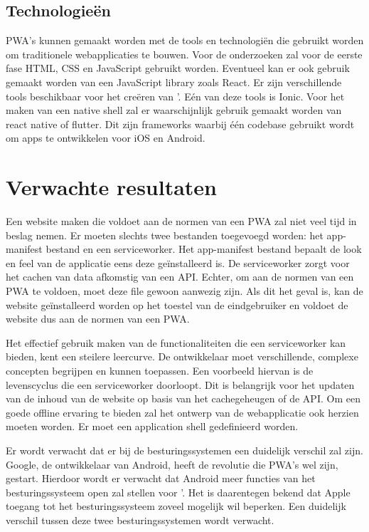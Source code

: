 \subsection{Technologieën}

PWA's kunnen gemaakt worden met de tools en technologiën die gebruikt worden om traditionele webapplicaties te bouwen. 
Voor de onderzoeken zal voor de eerste fase HTML, CSS en JavaScript gebruikt worden. Eventueel kan er ook gebruik gemaakt worden van een JavaScript library zoals React.
Er zijn verschillende tools beschikbaar voor het creëren van '. Eén van deze tools is Ionic.
Voor het maken van een native shell zal er waarschijnlijk gebruik gemaakt worden van react native of flutter. Dit zijn frameworks waarbij één codebase gebruikt wordt om apps te ontwikkelen voor iOS en Android.




\section{Verwachte resultaten}
\label{sec:verwachte_resultaten}


Een website maken die voldoet aan de normen van een PWA zal niet veel tijd in beslag nemen. Er moeten slechts twee bestanden toegevoegd worden: het app-manifest bestand en een serviceworker. Het app-manifest bestand bepaalt de look en feel van de applicatie eens deze geïnstalleerd is. 
De serviceworker zorgt voor het cachen van data afkomstig van een API. Echter, om aan de normen van een PWA te voldoen, moet deze file gewoon aanwezig zijn. 
Als dit het geval is, kan de website geïnstalleerd worden op het toestel van de eindgebruiker en voldoet de website dus aan de normen van een PWA.

Het effectief gebruik maken van de functionaliteiten die een serviceworker kan bieden, kent een steilere leercurve. De ontwikkelaar moet verschillende, complexe concepten begrijpen en kunnen toepassen. 
Een voorbeeld hiervan is de levenscyclus die een serviceworker doorloopt. Dit is belangrijk voor het updaten van de inhoud van de website op basis van het cachegeheugen of de API. 
Om een goede offline ervaring te bieden zal het ontwerp van de webapplicatie ook herzien moeten worden. Er moet een application shell gedefinieerd worden.
\autocite{Gaunt2019} \autocite{Osmani2016}

Er wordt verwacht dat er bij de besturingssystemen een duidelijk verschil zal zijn. 
Google, de ontwikkelaar van Android, heeft de revolutie die PWA's wel zijn, gestart.
Hierdoor wordt er verwacht dat Android meer functies van het besturingssysteem open zal stellen voor '.
Het is daarentegen bekend dat Apple toegang tot het besturingssysteem zoveel mogelijk wil beperken. Een duidelijk verschil tussen deze twee besturingssystemen wordt verwacht. 
\autocite{Hansen2017}




